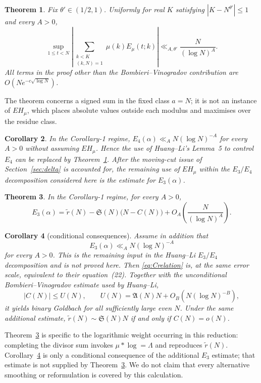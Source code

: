 \documentclass[11pt,a4paper]{article}
\theoremstyle{plain}
\newtheorem{theorem}{Theorem}
\newtheorem{corollary}[theorem]{Corollary}
\theoremstyle{definition}
\theoremstyle{remark}
\renewcommand{\SS}{\mathfrak{S}}
\newcommand{\AAA}{\mathfrak{A}}
\newcommand{\Emu}{E_\mu}
\begin{document}
\begin{theorem}\label{thm:A}
Fix $\theta'\in(1/2,1)$.  Uniformly for real $K$ satisfying
$|K-N^{\theta'}|\le1$ and every $A>0$,
\[
 \sup_{1\le t<N}
 \left|\sum_{\substack{k<K\\(k,N)=1}}\mu(k)\Emu(t;k)\right|
 \ll_{A,\theta'}\frac{N}{(\log N)^A}.
\]
All terms in the proof other than the Bombieri--Vinogradov contribution
are $O(Ne^{-c\sqrt{\log N}})$.
\end{theorem}

The theorem concerns a signed sum in the fixed class $a=N$; it is not an
instance of $EH_\mu$, which places absolute values outside each modulus
and maximises over the residue class.

\begin{corollary}\label{cor:B}
In the Corollary-1 regime,
$E_4(\alpha)\ll_A N(\log N)^{-A}$ for every $A>0$ without assuming
$EH_\mu$.  Hence the use of Huang--Li's Lemma~5 to control $E_4$ can be
replaced by Theorem~\ref{thm:A}.  After the moving-cut issue of
Section~\ref{sec:delta} is accounted for, the remaining use of
$EH_\mu$ within the $E_3/E_4$ decomposition considered here is the
estimate for $E_3(\alpha)$.
\end{corollary}

\begin{theorem}\label{thm:C}
In the Corollary-1 regime, for every $A>0$,
\begin{equation}\label{eq:Crelation}
 E_3(\alpha)=\widetilde r(N)-\SS(N)\bigl(N-C(N)\bigr)
 +O_A\!\left(\frac{N}{(\log N)^A}\right).
\end{equation}
\end{theorem}

\begin{corollary}[conditional consequences]\label{cor:Cconseq}
Assume in addition that
\[
 E_3(\alpha)\ll_A N(\log N)^{-A}
\]
for every $A>0$.  This is the remaining input in the Huang--Li
$E_3/E_4$ decomposition and is not proved here.  Then
\eqref{eq:Crelation} is, at the same error scale, equivalent to their
equation~(22).  Together with the unconditional Bombieri--Vinogradov
estimate used by Huang--Li,
\[
 |C(N)|\le U(N),\qquad
 U(N)=\AAA(N)N+O_B\!\left(N(\log N)^{-B}\right),
\]
it yields binary Goldbach for all sufficiently large even $N$.
Under the same additional estimate,
$\widetilde r(N)\sim\SS(N)N$ if and only if $C(N)=o(N)$.
\end{corollary}

Theorem~\ref{thm:C} is specific to the logarithmic weight occurring in
this reduction: completing the divisor sum invokes
$\mu*\log=\Lambda$ and reproduces $\widetilde r(N)$.  Corollary~\ref{cor:Cconseq}
is only a conditional consequence of the additional $E_3$ estimate;
that estimate is not supplied by Theorem~\ref{thm:C}.  We do not claim
that every alternative smoothing or reformulation is covered by this
calculation.
\end{document}

